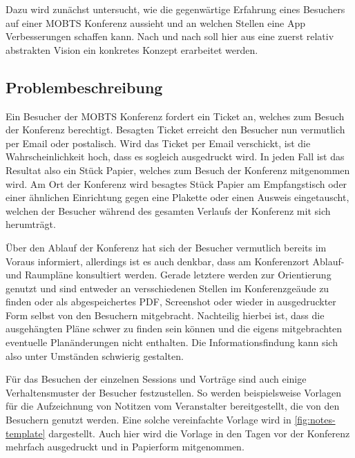 Dazu wird zunächst untersucht, wie die gegenwärtige Erfahrung eines Besuchers auf einer \ac{MOBTS} Konferenz aussieht und an welchen Stellen eine App Verbesserungen schaffen kann.
Nach und nach soll hier aus eine zuerst relativ abstrakten Vision ein konkretes Konzept erarbeitet werden.

\subsection{Problembeschreibung}
Ein Besucher der \ac{MOBTS} Konferenz fordert ein Ticket an, welches zum Besuch der Konferenz berechtigt.
Besagten Ticket erreicht den Besucher nun vermutlich per Email oder postalisch.
Wird das Ticket per Email verschickt, ist die Wahrscheinlichkeit hoch, dass es sogleich ausgedruckt wird.
In jeden Fall ist das Resultat also ein Stück Papier, welches zum Besuch der Konferenz mitgenommen wird.
Am Ort der Konferenz wird besagtes Stück Papier am Empfangstisch oder einer ähnlichen Einrichtung gegen eine Plakette oder einen Ausweis eingetauscht, welchen der Besucher während des gesamten Verlaufs der Konferenz mit sich herumträgt.

Über den Ablauf der Konferenz hat sich der Besucher vermutlich bereits im Voraus informiert, allerdings ist es auch denkbar, dass am Konferenzort Ablauf- und Raumpläne konsultiert werden. 
Gerade letztere werden zur Orientierung genutzt und sind entweder an versschiedenen Stellen im Konferenzgeäude zu finden oder als abgespeichertes PDF, Screenshot oder wieder in ausgedruckter Form selbst von den Besuchern mitgebracht.
Nachteilig hierbei ist, dass die ausgehängten Pläne schwer zu finden sein können und die eigens mitgebrachten eventuelle Planänderungen nicht enthalten.
Die Informationsfindung kann sich also unter Umständen schwierig gestalten.

Für das Besuchen der einzelnen Sessions und Vorträge sind auch einige Verhaltensmuster der Besucher festzustellen.
So werden beispielsweise Vorlagen für die Aufzeichnung von Notitzen vom Veranstalter bereitgestellt, die von den Besuchern genutzt werden.
Eine solche vereinfachte Vorlage wird in \autoref{fig:notes-template} dargestellt.
Auch hier wird die Vorlage in den Tagen vor der Konferenz mehrfach ausgedruckt und in Papierform mitgenommen.

